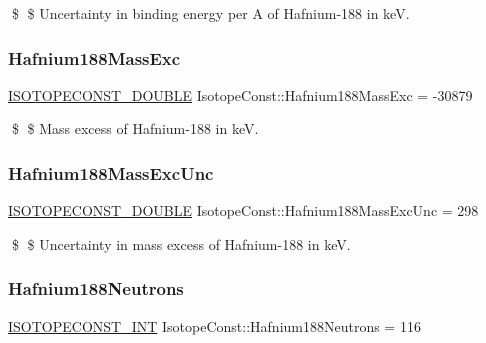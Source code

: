 \$ \$ Uncertainty in binding energy per A of Hafnium-\/188 in keV. \mbox{\label{group___isotope_const-_hafnium-_hf188_gad6e958325f535106dea974f1c3708ac0}} 
\subsubsection{\texorpdfstring{Hafnium188\+Mass\+Exc}{Hafnium188MassExc}}
{\footnotesize\ttfamily \mbox{\hyperlink{group___isotope_const-_macros_ga8f45a7272ce02c0b4c65c44636ed719a}{I\+S\+O\+T\+O\+P\+E\+C\+O\+N\+S\+T\+\_\+\+D\+O\+U\+B\+LE}} Isotope\+Const\+::\+Hafnium188\+Mass\+Exc = -\/30879}

\$ \$ Mass excess of Hafnium-\/188 in keV. \mbox{\label{group___isotope_const-_hafnium-_hf188_ga686827c8154d4652f187ae08ec3051dc}} 
\subsubsection{\texorpdfstring{Hafnium188\+Mass\+Exc\+Unc}{Hafnium188MassExcUnc}}
{\footnotesize\ttfamily \mbox{\hyperlink{group___isotope_const-_macros_ga8f45a7272ce02c0b4c65c44636ed719a}{I\+S\+O\+T\+O\+P\+E\+C\+O\+N\+S\+T\+\_\+\+D\+O\+U\+B\+LE}} Isotope\+Const\+::\+Hafnium188\+Mass\+Exc\+Unc = 298}

\$ \$ Uncertainty in mass excess of Hafnium-\/188 in keV. \mbox{\label{group___isotope_const-_hafnium-_hf188_gae71b171d96247a138393f4f4c5a46a06}} 
\subsubsection{\texorpdfstring{Hafnium188\+Neutrons}{Hafnium188Neutrons}}
{\footnotesize\ttfamily \mbox{\hyperlink{group___isotope_const-_macros_ga5f18360b3e99483a35c32d789e62621c}{I\+S\+O\+T\+O\+P\+E\+C\+O\+N\+S\+T\+\_\+\+I\+NT}} Isotope\+Const\+::\+Hafnium188\+Neutrons = 116}

